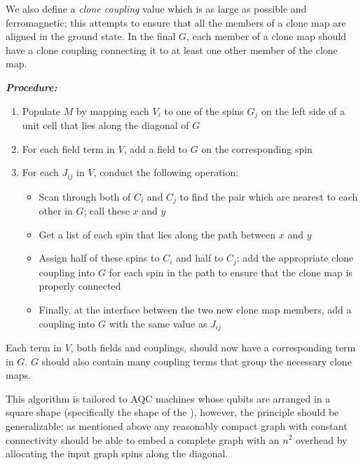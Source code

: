 We also define a \emph{clone coupling} value which is as large as possible and ferromagnetic; this attempts to ensure that all the members of a clone map are aligned in the ground state.  In the final $G$, each member of a clone map should have a clone coupling connecting it to at least one other member of the clone map.

\emph{\textbf{Procedure:}}
\begin{enumerate}
	\item Populate $M$ by mapping each $V_i$ to one of the spins $G_j$ on the left side of a unit cell that lies along the diagonal of $G$
	\item For each field term in $V$, add a field to $G$ on the corresponding spin
	\item For each $J_{ij}$ in $V$, conduct the following operation:
		\begin{itemize}
			\item Scan through both of $C_i$ and $C_j$ to find the pair which are nearest to each other in $G$; call these $x$ and $y$
			\item Get a list of each spin that lies along the path between $x$ and $y$
			\item Assign half of these spins to $C_i$ and half to $C_j$; add the appropriate clone coupling into $G$ for each spin in the path to ensure that the clone map is properly connected
			\item Finally, at the interface between the two new clone map members, add a coupling into $G$ with the same value as $J_{ij}$
		\end{itemize}
\end{enumerate}

Each term in $V$, both fields and couplings, should now have a corresponding term in $G$.  $G$ should also contain many coupling terms that group the necessary clone maps.  

This algorithm is tailored to AQC machines whose qubits are arranged in a square shape (specifically the shape of the \machine), however, the principle should be generalizable: as mentioned above any reasonably compact graph with constant connectivity should be able to embed a complete graph with an $n^2$ overhead by allocating the input graph spins along the diagonal.
